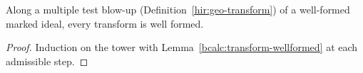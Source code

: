 \begin{lemma}
\label{hir:wellformed-tower}
\leanok
Along a multiple test blow-up (Definition~\ref{hir:geo-transform}) of a well-formed marked ideal, every transform is well formed.
\end{lemma}
\begin{proof}
\leanok
Induction on the tower with Lemma~\ref{bcalc:transform-wellformed} at each admissible step.
\end{proof}
